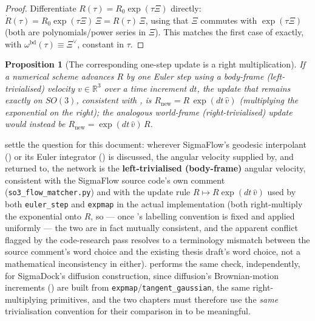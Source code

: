 \documentclass[11pt,a4paper]{report}
\newtheorem{proposition}[proposition]{Proposition}
\theoremstyle{definition}
\theoremstyle{remark}
\newcommand{\RR}{\mathbb R}
\newcommand{\file}[1]{\texttt{#1}}
\newcommand{\pyfunc}[1]{\texttt{#1}}
\begin{document}
\begin{proof}
Differentiate $R(\tau)=R_0\exp(\tau\Xi)$ directly:
$\dot R(\tau) = R_0\exp(\tau\Xi)\,\Xi = R(\tau)\,\Xi$, using that $\Xi$
commutes with $\exp(\tau\Xi)$ (both are polynomials/power series in $\Xi$).
This matches the first case of  exactly,
with $\omega^{\mathrm{bd}}(\tau)\equiv\Xi^\vee$, constant in $\tau$.
\end{proof}

\begin{proposition}[The corresponding one-step update is a right multiplication]
\label{prop:euler-body-triv}
If a numerical scheme advances $R$ by one Euler step using a body-frame (left-trivialised)
velocity $v\in\RR^3$ over a time increment $dt$, the update that remains
exactly on $SO(3)$, consistent with , is
$R_{\mathrm{new}} = R\,\exp(dt\,\widehat v)$ (multiplying the exponential on
the \emph{right}); the analogous world-frame (right-trivialised) update would instead be
$R_{\mathrm{new}}=\exp(dt\,\widehat v)\,R$.
\end{proposition}

 settle the question
for this document: wherever SigmaFlow's geodesic interpolant
() or its Euler integrator
() is discussed, the angular velocity supplied
by, and returned to, the network is the \textbf{left-trivialised (body-frame)}
angular velocity, consistent with the SigmaFlow source code's own comment
(\file{so3\_flow\_matcher.py}) and with the update rule
$R\mapsto R\exp(dt\,\widehat v)$ used by both \pyfunc{euler\_step} and
\pyfunc{expmap} in the actual implementation (both right-multiply the
exponential onto $R$, so --- once 's
labelling convention is fixed and applied uniformly --- the two are in fact
mutually consistent, and the apparent conflict flagged by the code-research
pass resolves to a terminology mismatch between the source comment's word
choice and the existing thesis draft's word choice, not a mathematical
inconsistency in either).  performs the same check,
independently, for SigmaDock's diffusion construction, since diffusion's
Brownian-motion increments () are built from
\pyfunc{expmap}/\pyfunc{tangent\_gaussian}, the same right-multiplying
primitives, and the two chapters must therefore use the \emph{same}
trivialisation convention for their comparison in  to
be meaningful.
\end{document}
